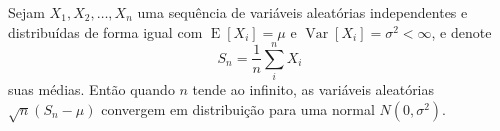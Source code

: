\documentclass{article}
\begin{document}
Sejam $X_1, X_2, \ldots, X_n$ uma sequência de variáveis aleatórias
independentes e distribuídas de forma igual com $\operatorname{E}[X_i] = \mu$
e $\operatorname{Var}[X_i] = \sigma^2 < \infty$, e denote
\begin{equation*}
S_n = \frac{1}{n}\sum_{i}^{n} X_i
\end{equation*}
suas médias. Então quando $n$ tende ao infinito, as variáveis aleatórias  
$\sqrt{n}(S_n - \mu)$ convergem em distribuição para uma normal $N(0,
\sigma^2)$.

\end{document}
